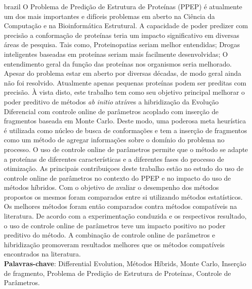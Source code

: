 \begin{resumo}[Resumo]
 \begin{otherlanguage*}{brazil}
O Problema de Predição de Estrutura de Proteínas (PPEP) é atualmente um dos mais importantes e difíceis problemas 
em aberto na Ciência da Computação e na Bioinformática Estrutural.
A capacidade de poder predizer com precisão a conformação de proteínas
teria um impacto significativo em diversas áreas de pesquisa. Tais como, 
Proteinopatias seriam melhor entendidas; Drogas inteligentes baseadas em proteínas seriam mais facilmente
desenvolvidas; O entendimento geral da função das proteínas nos organismos seria melhorado.
Apesar do problema estar em aberto por diversas décadas, de modo geral ainda não foi resolvido. Atualmente
apenas pequenas proteínas podem ser preditas com precisão. À vista disto, este trabalho tem como seu objetivo
principal melhorar o poder preditivo de métodos \textit{ab initio} atráves a hibridização da Evolução Diferencial
com controle online de parâmetros acoplado com inserção de fragmentos baseada em Monte Carlo.
Deste modo, uma poderosa meta heurística é utilizada como núcleo de busca de conformações e tem a inserção
de fragmentos como um método de agregar informações sobre o domínio do problema no processo.
O uso de controle online de parâmetros permite que o método se adapte a proteínas de diferentes características
e a diferentes fases do processo de otimização. As principais contribuiçoes deste trabalho estão no estudo
do uso de controle online de parâmetros no contexto do PPEP e no impacto do uso de métodos híbridos.
Com o objetivo de avaliar o desempenho dos métodos propostos os mesmos foram comparados entre si utilizando
métodos estatísticos. Os melhores métodos foram então comparados contra métodos compatíveis na literatura.
De acordo com a experimentação conduzida e os respectivos resultado, o uso de controle online de parâmetros
teve um impacto positivo no poder preditivo do método. A combinação de controle online de parâmetros e hibridização
promoveram resultados melhores que os métodos compatíveis encontrados na literatura.
  \\
   \vspace{\onelineskip}
   \noindent 
   \textbf{Palavras-chave}: Differential Evolution, Métodos Híbrids, Monte Carlo, Inserção de fragmento, Problema de Predição de Estrutura de Proteínas, Controle de Parâmetros.
 \end{otherlanguage*}
\end{resumo}

\listoffigures*
\cleardoublepage

\listoftables*
\cleardoublepage
